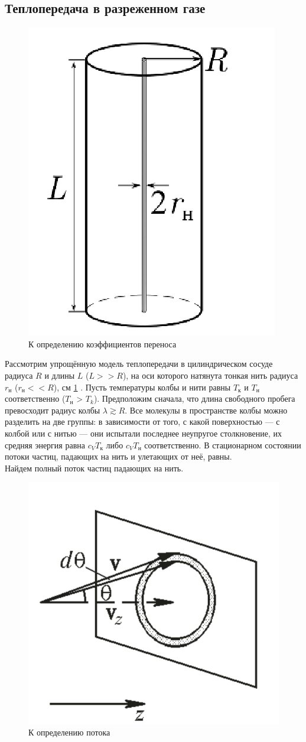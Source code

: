 \documentclass[12pt]{article}
\begin{document}
        \subsection{Теплопередача в разреженном газе}
        \begin{figure}[H]
            \centering
            \includegraphics[width=0.4\linewidth]{task_geometry.png}
            \caption{К определению коэффициентов переноса}
            \label{fig:geom}
        \end{figure}
        Рассмотрим упрощённую модель теплопередачи в цилиндрическом сосуде радиуса $R$ и длины $L$ ($L >>R$),
        на оси которого натянута тонкая нить радиуса $r_\text{н}$ ($r_\text{н} << R$), см \ref{fig:geom} \cite{labnik}.
        Пусть температуры колбы и нити равны $T_\text{к}$ и $T_\text{н}$ соответственно ($T_\text{н}$ > $T_k$).
        Предположим сначала, что длина свободного пробега превосходит радиус колбы $\lambda \gtrsim R$.
        Все молекулы в пространстве колбы можно разделить на две группы: в зависимости от того, с какой поверхностью —
        с колбой или с нитью — они испытали последнее неупругое столкновение, их средняя энергия равна $c_VT_\text{к}$ либо $c_VT_\text{н}$
        соответственно. В стационарном состоянии потоки частиц, падающих на нить и улетающих от неё, равны.\\
        Найдем полный поток частиц падающих на нить.
        \begin{figure}[H]
            \centering
            \includegraphics[width=0.4\linewidth]{collision_with_wall.png}
            \caption{К определению потока}
            \label{collision}
        \end{figure}
\end{document}
